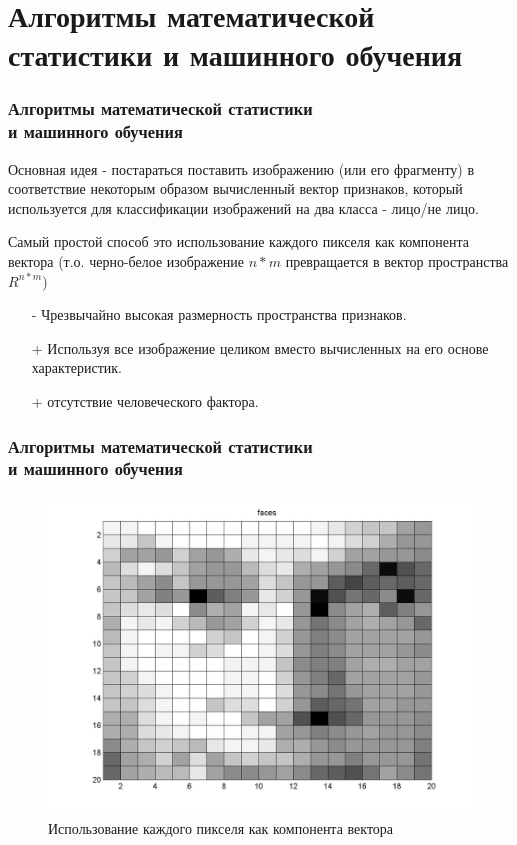 \documentclass{beamer}
\begin{document}
\section{Алгоритмы математической статистики и машинного обучения}

\begin{frame}
\frametitle{Алгоритмы математической статистики\\и машинного обучения}

Основная идея - постараться поставить изображению (или его фрагменту) в соответствие некоторым образом вычисленный вектор признаков, который используется для классификации изображений на два класса - лицо/не лицо.
\bigskip

Самый простой способ это использование каждого пикселя как компонента вектора (т.о. черно-белое изображение $n*m$ превращается в вектор пространства $R^{n*m}$)

\begin{itemize}
\item[-] Чрезвычайно высокая размерность пространства признаков.
\item[+] Используя все изображение целиком вместо вычисленных на его основе характеристик.
\item[+] отсутствие человеческого фактора.
\end{itemize}

\end{frame}

\begin{frame}
\frametitle{Алгоритмы математической статистики\\и машинного обучения}

\begin{figure}
\includegraphics[scale=0.2]{res/img00}
\caption{Использование каждого пикселя как компонента вектора}
\end{figure}
\end{frame}
\end{document}

